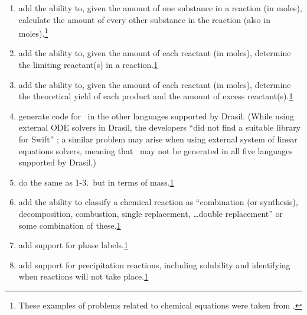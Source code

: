\documentclass{article}
\begin{document}
\begin{enumerate}
	\item add the ability to, given the amount of one substance in a reaction (in
	moles), calculate the amount of every other substance in the reaction (also in
	moles).\footnote{\label{chemProbExs}These examples of problems related to
		chemical equations were taken from \cite{lund_introduction_2023}.}
	\item add the ability to, given the amount of each reactant (in moles),
	determine the limiting reactant(s) in a
	reaction.\cref{chemProbExs}
	\item add the ability to, given the amount of each reactant (in moles),
	determine the theoretical yield of each product and the amount of excess
	reactant(s).\cref{chemProbExs}
	\item generate code for \progname~in the other languages supported by
	Drasil. (While using external ODE solvers in Drasil, the developers ``did not
		find a suitable library for Swift'' \cite[p.~24]{chen_solving_2022}; a similar
		problem may arise when using external system of linear equations solvers,
		meaning that \progname~may not be generated in all five languages supported
		by Drasil.)
	\item do the same as 1-3.~but in terms of mass.\cref{chemProbExs}
	\item add the ability to classify a chemical reaction as ``combination (or
		synthesis), decomposition, combustion, single replacement, \dots double
		replacement'' \cite[p.~301]{lund_introduction_2023} or some combination of
		these.\cref{chemProbExs}
	\item add support for phase labels.\cref{chemProbExs}
	\item add support for precipitation reactions, including solubility and 
	identifying when reactions will not take place.\cref{chemProbExs}
\end{enumerate}

\newpage



\end{document}
